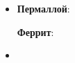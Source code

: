 \documentclass[12pt]{kiarticle} %
\begin{document}
\begin{enumerate}
\begin{itemize}
  		
  	\item	\textbf{Пермаллой}:
  	
  		
  		\textbf{Феррит}:
  		
  	\item	{}
  		
  	\end{itemize}
  		
  	\end{enumerate}
\end{document}
